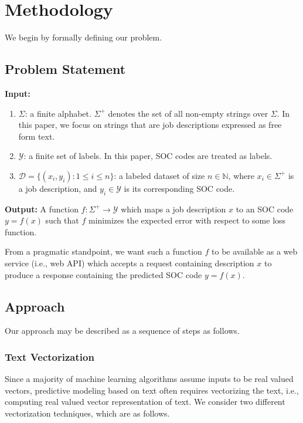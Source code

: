 \section{Methodology}
\label{sec:Methodology}

We begin by formally defining our problem.  
\subsection{Problem Statement}
\label{subsec:ProblemStatement}

\noindent \textbf{Input:}
\begin{enumerate}
    \item $\Sigma$: a finite alphabet. $\Sigma^+$ denotes the set of all non-empty strings over $\Sigma$. In this paper, we focus on strings that are job descriptions expressed as free form text.
    \item $\mathcal{Y}$: a finite set of labels. In this paper, SOC codes are treated as labels.
    \item $\mathcal{D} = \{(x_i, y_i): 1 \leq i \leq n \}$: a labeled dataset of size $n \in \mathbb{N}$, where $x_i \in \Sigma^+$ is a job description, and $y_i \in \mathcal{Y}$ is its corresponding SOC code.
\end{enumerate}

\noindent \textbf{Output:}
A function $f: \Sigma^+ \rightarrow \mathcal{Y}$ which maps a job description $x$ to an SOC code $y = f(x)$ such that $f$ minimizes the expected error with respect to some loss function.

From a pragmatic standpoint, we want such a function $f$ to be available as a web service (i.e., web API) which accepts a request containing description $x$ to produce a response containing the predicted SOC code $y = f(x)$.

\subsection{Approach}
\label{subsec:Approach}

Our approach may be described as a sequence of steps as follows.

\subsubsection{Text Vectorization}
Since a majority of machine learning algorithms assume inputs to be real valued vectors, predictive modeling based on text often requires vectorizing the text, i.e., computing real valued vector representation of text. We consider two different vectorization techniques, which are as follows.
